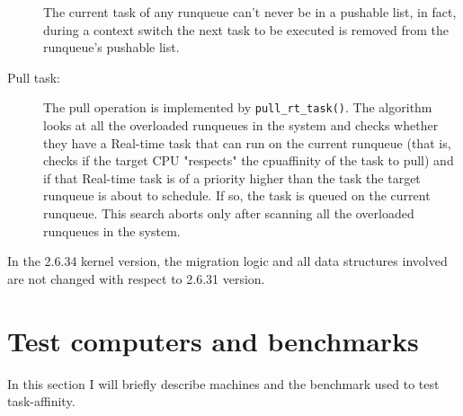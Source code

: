 \begin{description}
The current task of any runqueue can't never be in a pushable list, in fact, during a context switch the next task to be executed is removed from the 
runqueue's pushable list.

\item[Pull task:] The pull operation is implemented by \texttt{pull\_rt\_task()}. The algorithm looks at all the overloaded runqueues in the system 
and checks whether they have a Real-time task that can run on the current
runqueue (that is, checks if the target CPU "respects" the cpuaffinity of 
the task to pull) and if that Real-time task is of a priority higher than the task the target runqueue is about to schedule. If so, the task is 
queued on the current runqueue. This search aborts only after scanning all the overloaded runqueues in the system. 

\end{description}

In the 2.6.34 kernel version, the migration logic and all data structures involved are not changed with respect to 2.6.31 version.

\section{Test computers and benchmarks}

In this section I will briefly describe machines and the benchmark used to test task-affinity.

